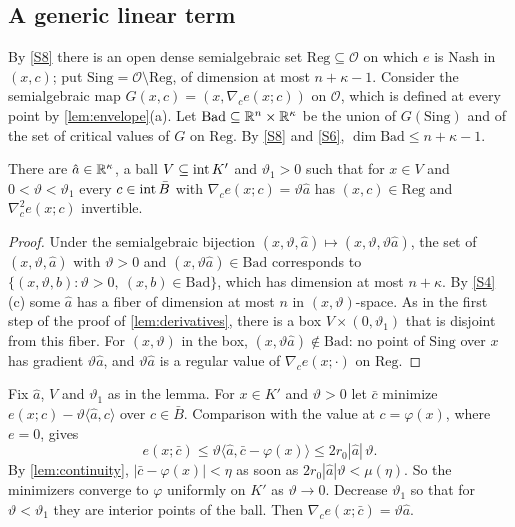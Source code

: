 \subsection{A generic linear term}

By \ref{S8} there is an open dense semialgebraic set $\mathrm{Reg}\subseteq\mathcal O$ on which $e$ is Nash in $(x,c)$; put $\mathrm{Sing}=\mathcal O\setminus\mathrm{Reg}$, of dimension at most $n+\kappa-1$. Consider the semialgebraic map $G(x,c)=(x,\nabla_ce(x;c))$ on $\mathcal O$, which is defined at every point by \cref{lem:envelope}(a). Let $\mathrm{Bad}\subseteq\mathbb{R}^n\times\mathbb{R}^\kappa$ be the union of $G(\mathrm{Sing})$ and of the set of critical values of $G$ on $\mathrm{Reg}$. By \ref{S8} and \ref{S6}, $\dim\mathrm{Bad}\le n+\kappa-1$.

\begin{lemma}\label{lem:tilt}
There are $\hat a\in\mathbb{R}^\kappa$, a ball $V\subseteq\operatorname{int} K'$ and $\vartheta_1>0$ such that for $x\in V$ and $0<\vartheta<\vartheta_1$ every $c\in\operatorname{int}\bar B$ with $\nabla_ce(x;c)=\vartheta\hat a$ has $(x,c)\in\mathrm{Reg}$ and $\nabla_c^2e(x;c)$ invertible.
\end{lemma}

\begin{proof}
Under the semialgebraic bijection $(x,\vartheta,\hat a)\mapsto(x,\vartheta,\vartheta\hat a)$, the set of $(x,\vartheta,\hat a)$ with $\vartheta>0$ and $(x,\vartheta\hat a)\in\mathrm{Bad}$ corresponds to $\{(x,\vartheta,b):\vartheta>0,\ (x,b)\in\mathrm{Bad}\}$, which has dimension at most $n+\kappa$. By \ref{S4}(c) some $\hat a$ has a fiber of dimension at most $n$ in $(x,\vartheta)$-space. As in the first step of the proof of \cref{lem:derivatives}, there is a box $V\times(0,\vartheta_1)$ that is disjoint from this fiber. For $(x,\vartheta)$ in the box, $(x,\vartheta\hat a)\notin\mathrm{Bad}$: no point of $\mathrm{Sing}$ over $x$ has gradient $\vartheta\hat a$, and $\vartheta\hat a$ is a regular value of $\nabla_ce(x;\cdot)$ on $\mathrm{Reg}$.
\end{proof}

Fix $\hat a$, $V$ and $\vartheta_1$ as in the lemma. For $x\in K'$ and $\vartheta>0$ let $\bar c$ minimize $e(x;c)-\vartheta\langle\hat a,c\rangle$ over $c\in\bar B$. Comparison with the value at $c=\varphi(x)$, where $e=0$, gives
\[
e(x;\bar c)\le\vartheta\langle\hat a,\bar c-\varphi(x)\rangle\le2r_0|\hat a|\,\vartheta .
\]
By \cref{lem:continuity}, $|\bar c-\varphi(x)|<\eta$ as soon as $2r_0|\hat a|\vartheta<\mu(\eta)$. So the minimizers converge to $\varphi$ uniformly on $K'$ as $\vartheta\to0$. Decrease $\vartheta_1$ so that for $\vartheta<\vartheta_1$ they are interior points of the ball. Then $\nabla_ce(x;\bar c)=\vartheta\hat a$.

